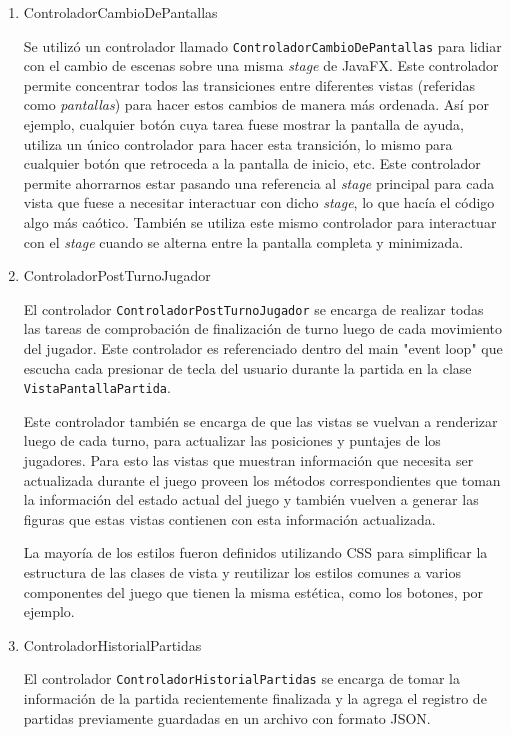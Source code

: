 \documentclass[titlepage,a4paper]{article}
\begin{document}
\begin{enumerate}
\item ControladorCambioDePantallas
\label{sec:org14c53b2}

Se utilizó un controlador llamado \texttt{ControladorCambioDePantallas} para
lidiar con el cambio de escenas sobre una misma \emph{stage} de
JavaFX. Este controlador permite concentrar todos las transiciones
entre diferentes vistas (referidas como \emph{pantallas}) para hacer estos
cambios de manera más ordenada. Así por ejemplo, cualquier botón cuya
tarea fuese mostrar la pantalla de ayuda, utiliza un único controlador
para hacer esta transición, lo mismo para cualquier botón que
retroceda a la pantalla de inicio, etc. Este controlador permite
ahorrarnos estar pasando una referencia al \emph{stage} principal para cada
vista que fuese a necesitar interactuar con dicho \emph{stage}, lo que hacía
el código algo más caótico. También se utiliza este mismo controlador
para interactuar con el \emph{stage} cuando se alterna entre la pantalla
completa y minimizada.

\item ControladorPostTurnoJugador
\label{sec:org544b03c}

El controlador \texttt{ControladorPostTurnoJugador} se encarga de realizar
todas las tareas de comprobación de finalización de turno luego de
cada movimiento del jugador. Este controlador es referenciado dentro
del main "event loop" que escucha cada presionar de tecla del usuario
durante la partida en la clase \texttt{VistaPantallaPartida}.

Este controlador también se encarga de que las vistas se vuelvan a
renderizar luego de cada turno, para actualizar las posiciones y
puntajes de los jugadores. Para esto las vistas que muestran
información que necesita ser actualizada durante el juego proveen los
métodos correspondientes que toman la información del estado actual
del juego y también vuelven a generar las figuras que estas vistas
contienen con esta información actualizada.

La mayoría de los estilos fueron definidos utilizando CSS para
simplificar la estructura de las clases de vista y reutilizar los
estilos comunes a varios componentes del juego que tienen la misma
estética, como los botones, por ejemplo.

\item ControladorHistorialPartidas
\label{sec:orga26652c}

El controlador \texttt{ControladorHistorialPartidas} se encarga de tomar la
información de la partida recientemente finalizada y la agrega el
registro de partidas previamente guardadas en un archivo con formato
JSON.
\end{enumerate}
\end{document}
